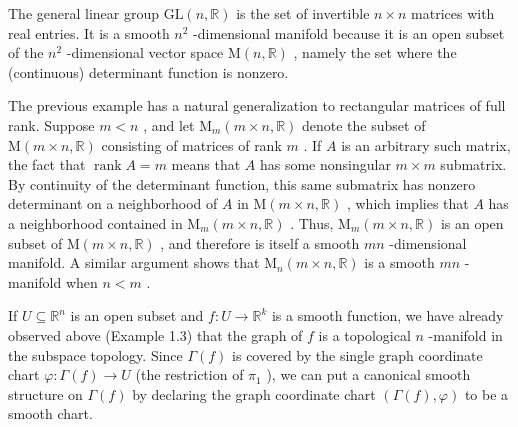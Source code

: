 \begin{example}
\label{ex:1-27}
\mathlibok
{}
The general linear group $\mathrm{{GL}}\left( {n,\mathbb{R}}\right)$ is the set of invertible $n \times  n$ matrices with real entries. It is a smooth ${n}^{2}$ -dimensional manifold because it is an open subset of the ${n}^{2}$ -dimensional vector space $\mathrm{M}\left( {n,\mathbb{R}}\right)$ , namely the set where the (continuous) determinant function is nonzero.
\end{example}

\begin{example}
\label{ex:1-28}
\leanok
{}
The previous example has a natural generalization to rectangular matrices of full rank. Suppose $m < n$ , and let ${\mathrm{M}}_{m}\left( {m \times  n,\mathbb{R}}\right)$ denote the subset of $\mathrm{M}\left( {m \times  n,\mathbb{R}}\right)$ consisting of matrices of rank $m$ . If $A$ is an arbitrary such matrix, the fact that $\operatorname{rank}A = m$ means that $A$ has some nonsingular $m \times  m$ submatrix. By continuity of the determinant function, this same submatrix has nonzero determinant on a neighborhood of $A$ in $\mathrm{M}\left( {m \times  n,\mathbb{R}}\right)$ , which implies that $A$ has a neighborhood contained in ${\mathrm{M}}_{m}\left( {m \times  n,\mathbb{R}}\right)$ . Thus, ${\mathrm{M}}_{m}\left( {m \times  n,\mathbb{R}}\right)$ is an open subset of $\mathrm{M}\left( {m \times  n,\mathbb{R}}\right)$ , and therefore is itself a smooth ${mn}$ -dimensional manifold. A similar argument shows that ${\mathrm{M}}_{n}\left( {m \times  n,\mathbb{R}}\right)$ is a smooth ${mn}$ -manifold when $n < m$ .
\end{example}

\begin{example}
\label{ex:1-30}
\leanok
{}
If $U \subseteq  {\mathbb{R}}^{n}$ is an open subset and $f : U \rightarrow  {\mathbb{R}}^{k}$ is a smooth function, we have already observed above (Example 1.3) that the graph of $f$ is a topological $n$ -manifold in the subspace topology. Since $\Gamma \left( f\right)$ is covered by the single graph coordinate chart $\varphi  : \Gamma \left( f\right)  \rightarrow  U$ (the restriction of ${\pi }_{1}$ ), we can put a canonical smooth structure on $\Gamma \left( f\right)$ by declaring the graph coordinate chart $\left( {\Gamma \left( f\right) ,\varphi }\right)$ to be a smooth chart.
\end{example}

